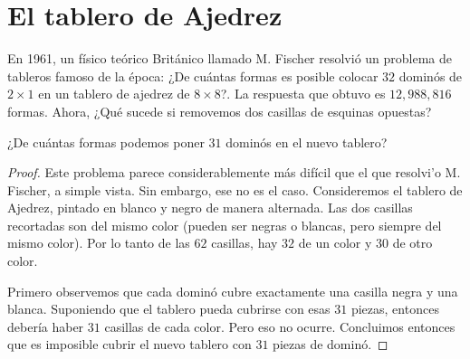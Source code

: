 \section{El tablero de Ajedrez}

En 1961, un f\'isico te\'orico Brit\'anico llamado M. Fischer resolvi\'o un problema de tableros famoso de la \'epoca: ¿De cu\'antas formas es posible colocar $32$ domin\'os de $2\times 1$ en un tablero de ajedrez de $8\times 8$?. La respuesta que obtuvo es $12,988,816$ formas. 
Ahora, ¿Qu\'e sucede si removemos dos casillas de esquinas opuestas?

\begin{ejem} \label{primerejemplo}
	 ¿De cu\'antas formas podemos poner $31$ domin\'os en el nuevo tablero?
\end{ejem}
\begin{proof}
	Este problema parece considerablemente m\'as dif\'icil que el que resolvi'o M. Fischer, a simple vista. Sin embargo, ese no es el caso. Consideremos el tablero de Ajedrez, pintado en blanco y negro de manera alternada. Las dos casillas recortadas son del mismo color (pueden ser negras o blancas, pero siempre del mismo color). Por lo tanto de las $62$ casillas, hay $32$ de un color y $30$ de otro color. 
	
	Primero observemos que cada domin\'o cubre exactamente una casilla negra y una blanca. Suponiendo que el tablero pueda cubrirse con esas $31$ piezas, entonces deber\'ia haber $31$ casillas de cada color. Pero eso no ocurre. Concluimos entonces que es imposible cubrir el nuevo tablero con $31$ piezas de domin\'o. 
\end{proof}
 

